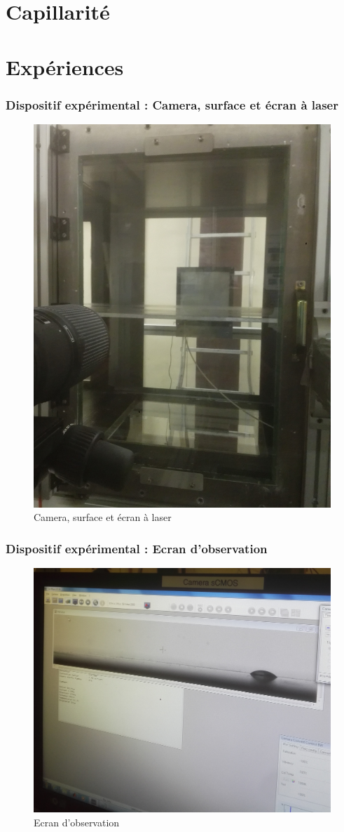 \documentclass{beamer}
\begin{document}
\section{Capillarité}\label{sec:capillarite}


\section{Expériences}\label{sec:experience}
\begin{frame}
\frametitle{Dispositif expérimental : Camera, surface et écran à laser}
\begin{figure}[!hb]
\centering
	\includegraphics[width = 0.4\linewidth]{./image/Surface.jpg}
	\caption{Camera, surface et écran à laser}
	\label{fig:Plan}
\end{figure}
\end{frame}


\begin{frame}
\frametitle{Dispositif expérimental : Ecran d'observation}
\begin{figure}[!hb]
\centering
	\includegraphics[width = 0.5\linewidth]{./image/Ecran.jpg}
	\caption{Ecran d'observation}
	\label{fig:Ecran d'observation}
\end{figure}
\end{frame}
\end{document}
